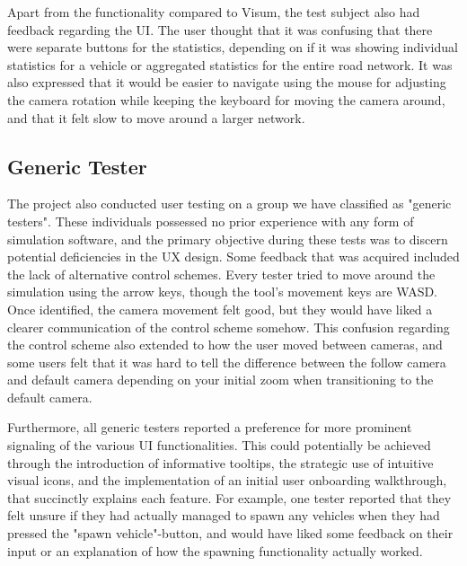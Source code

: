         Apart from the functionality compared to Visum, the test subject also had feedback regarding the UI. The user thought that it was confusing that there were separate buttons for the statistics, depending on if it was showing individual statistics for a vehicle or aggregated statistics for the entire road network. It was also expressed that it would be easier to navigate using the mouse for adjusting the camera rotation while keeping the keyboard for moving the camera around, and that it felt slow to move around a larger network.
    
    \subsection{Generic Tester}
        The project also conducted user testing on a group we have classified as "generic testers". These individuals possessed no prior experience with any form of simulation software, and the primary objective during these tests was to discern potential deficiencies in the UX design. Some feedback that was acquired included the lack of alternative control schemes. Every tester tried to move around the simulation using the arrow keys, though the tool's movement keys are WASD. Once identified, the camera movement felt good, but they would have liked a clearer communication of the control scheme somehow. This confusion regarding the control scheme also extended to how the user moved between cameras, and some users felt that it was hard to tell the difference between the follow camera and default camera depending on your initial zoom when transitioning to the default camera.

        Furthermore, all generic testers reported a preference for more prominent signaling of the various UI functionalities. This could potentially be achieved through the introduction of informative tooltips, the strategic use of intuitive visual icons, and the implementation of an initial user onboarding walkthrough, that succinctly explains each feature. For example, one tester reported that they felt unsure if they had actually managed to spawn any vehicles when they had pressed the "spawn vehicle"-button, and would have liked some feedback on their input or an explanation of how the spawning functionality actually worked.